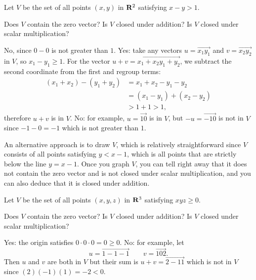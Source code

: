 \begin{problems}
\problem Let $V$ be the set of all points $(x, y)$ in ${\bf R}^2$
satisfying $x - y > 1$.
\begin{subproblems}
  \subproblem Does $V$ contain the zero vector?
  \subproblem Is $V$ closed under addition?%
  \subproblem Is $V$ closed under scalar multiplication?
\end{subproblems}
\begin{solution}
  \begin{subproblems}
    \subproblem No, since $0-0$ is not greater than $1$.  %
    \subproblem Yes: take any vectors $u = \vec{x_1 y_1}$ and
    $v = \vec{x_2 y_2}$ in $V$, so $x_1 - y_1 \geq 1$.  For the vector
    $u+v = \vec{x_1+x_2 y_1+y_2}$, we subtract the second coordinate
    from the first and regroup terms:
    \begin{align*}
      (x_1+x_2)-(y_1+y_2)
      &  = x_1+x_2 - y_1 - y_2 \\
      &  = (x_1 - y_1) + (x_2 - y_2) \\
      & > 1 + 1 > 1,
    \end{align*}
    therefore $u+v$ is in $V$.
    \subproblem No: for example, $u = \vec{1 0}$ is in $V$, but
    $-u = \vec{-1 0}$ is not in $V$ since $-1 - 0 = -1$ which is not
    greater than $1$.
  \end{subproblems}
  An alternative approach is to draw $V$, which is relatively
  straightforward since $V$ consists of all points satisfying
  $y < x - 1$, which is all points that are strictly below the line
  $y = x-1$.  Once you graph $V$, you can tell right away that it does
  not contain the zero vector and is not closed under scalar
  multiplication, and you can also deduce that it is closed under
  addition.
  \end{solution}

  \problem Let $V$ be the set of all points $(x, y, z)$ in ${\bf R}^3$
  satisfying $xyz \geq 0$.
  \begin{subproblems}
    \subproblem Does $V$ contain the zero vector?
    \subproblem Is $V$ closed under addition?
    \subproblem Is $V$ closed under scalar multiplication?
  \end{subproblems}
  \begin{solution}
    \begin{subproblems}
      \subproblem Yes: the origin satisfies
      $0\cdot 0 \cdot 0 = 0 \geq 0$.%
      \subproblem No: for example, let
      \[u = \vec{1 -1 -1} \qquad v = \vec{1 0 2}.\] Then $u$ and $v$
      are both in $V$ but their sum is $u+v = \vec{2 -1 1}$ which is
      not in $V$ since $(2)(-1)(1) = -2 < 0$.
    \end{subproblems}
  \end{solution}
  

\end{problems}
